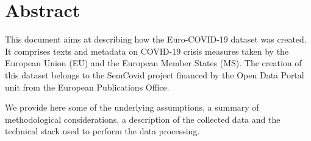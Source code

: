 \section*{Abstract}

This document aims at describing how the Euro-COVID-19 dataset was created. It comprises texts and metadata on COVID-19 crisis measures taken by the European Union (EU) and the European Member States (MS). The creation of this dataset belongs to the SemCovid project financed by the Open Data Portal unit from the European Publications Office.

We provide here some of the underlying assumptions, a summary of methodological considerations, a description of the collected data and the technical stack used to perform the data processing. 